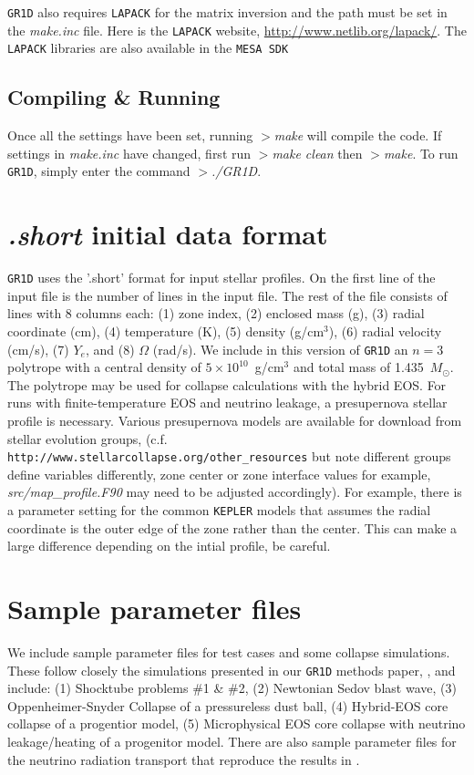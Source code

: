 \documentclass[10pt,nofootinbib]{article}
\newcommand{\code}[1]{\texttt{#1}}
\begin{document}
\code{GR1D} also requires \code{LAPACK} for the matrix inversion and
the path must be set in the \emph{make.inc} file.  Here is the
\code{LAPACK} website, \url{http://www.netlib.org/lapack/}.  The
\code{LAPACK} libraries are also available in the \code{MESA SDK}

\subsection{Compiling \& Running}
Once all the settings have been set, running {\emph{$>$make}} will compile
the code.  If settings in {\emph{make.inc}} have changed, first run
{\emph{$>$make clean}} then {\emph{$>$make}}.  To run \code{GR1D},
simply enter the command {\emph{$>$./GR1D}}.

\section{{\it.short} initial data format}
\code{GR1D} uses the '.short' format for input stellar profiles. On
the first line of the input file is the number of lines in the input
file.  The rest of the file consists of lines with 8 columns each: (1)
zone index, (2) enclosed mass (g), (3) radial coordinate (cm), (4)
temperature (K), (5) density (g/cm$^3$), (6) radial velocity (cm/s),
(7) $Y_e$, and (8) $\Omega$ (rad/s). We include in this version of
\code{GR1D} an $n=3$ polytrope with a central density of
$5\times10^{10}$~g/cm$^3$ and total mass of 1.435~$M_\odot$. The
polytrope may be used for collapse calculations with the hybrid
EOS. For runs with finite-temperature EOS and neutrino leakage, a
presupernova stellar profile is necessary.  Various presupernova
models are available for download from stellar evolution groups,
(c.f. {\tt http://www.stellarcollapse.org/other\_resources} but note
different groups define variables differently, zone center or zone
interface values for example, {\emph{src/map\_profile.F90}} may need to
be adjusted accordingly). For example, there is a parameter setting
for the common \code{KEPLER} models that assumes the radial coordinate
is the outer edge of the zone rather than the center.  This can make a
large difference depending on the intial profile, be careful.

\section{Sample parameter files}
We include sample parameter files for test cases and some collapse
simulations.  These follow closely the simulations presented in our
\code{GR1D} methods paper, \cite{oconnor:10}, and include: (1)
Shocktube problems \#1 \& \#2, (2) Newtonian Sedov blast wave, (3)
Oppenheimer-Snyder Collapse of a pressureless dust ball, (4)
Hybrid-EOS core collapse of a progentior model, (5) Microphysical EOS
core collapse with neutrino leakage/heating of a progenitor
model. There are also sample parameter files for the neutrino
radiation transport that reproduce the results in \cite{oconnor:14}.
\end{document}
